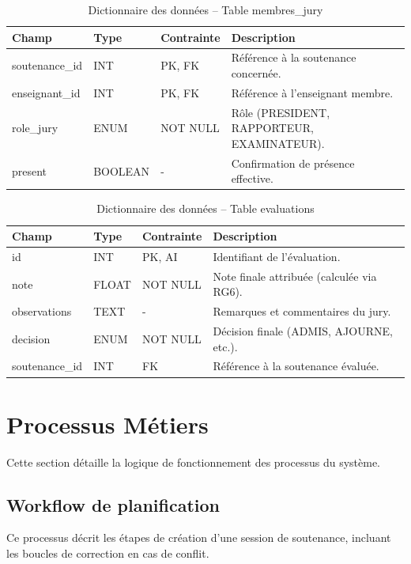 \documentclass[12pt,a4paper]{article}
\begin{document}
\begin{table}[H]
    \centering
    \small
    \begin{tabular}{lp{2cm}lp{6cm}}
        \toprule
        \rowcolor{primary!10}
        \textbf{Champ} & \textbf{Type} & \textbf{Contrainte} & \textbf{Description} \\
        \midrule
        soutenance\_id & INT & PK, FK & Référence à la soutenance concernée. \\
        enseignant\_id & INT & PK, FK & Référence à l'enseignant membre. \\
        role\_jury & ENUM & NOT NULL & Rôle (PRESIDENT, RAPPORTEUR, EXAMINATEUR). \\
        present & BOOLEAN & - & Confirmation de présence effective. \\
        \bottomrule
    \end{tabular}
    \caption{Dictionnaire des données -- Table membres\_jury}
\end{table}

\begin{table}[H]
    \centering
    \small
    \begin{tabular}{lp{2cm}lp{6cm}}
        \toprule
        \rowcolor{primary!10}
        \textbf{Champ} & \textbf{Type} & \textbf{Contrainte} & \textbf{Description} \\
        \midrule
        id & INT & PK, AI & Identifiant de l'évaluation. \\
        note & FLOAT & NOT NULL & Note finale attribuée (calculée via RG6). \\
        observations & TEXT & - & Remarques et commentaires du jury. \\
        decision & ENUM & NOT NULL & Décision finale (ADMIS, AJOURNE, etc.). \\
        soutenance\_id & INT & FK & Référence à la soutenance évaluée. \\
        \bottomrule
    \end{tabular}
    \caption{Dictionnaire des données -- Table evaluations}
\end{table}


\newpage
\section{Processus Métiers}
\label{sec:processus}

Cette section détaille la logique de fonctionnement des processus du système.

\subsection{Workflow de planification}
Ce processus décrit les étapes de création d'une session de soutenance, incluant les boucles de correction en cas de conflit.
\end{document}
